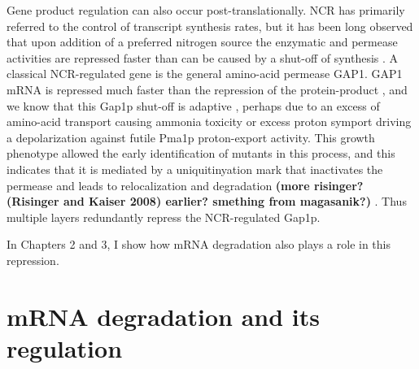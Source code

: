 Gene product
regulation can also occur post-translationally. NCR has primarily
referred to the control of transcript synthesis rates, but it has been
long observed that upon addition of a preferred nitrogen source the
enzymatic and permease activities are repressed faster than can be
caused by a shut-off of synthesis 
\citep{cooper1983function}. A
classical NCR-regulated gene is the general amino-acid permease GAP1.
GAP1 mRNA is repressed much faster than the repression of the
protein-product 
\citep{stanbrough1995transcriptional}
, and we know that this
Gap1p shut-off is adaptive \citep{risinger2006activity}, 
perhaps due to an
excess of amino-acid transport causing ammonia toxicity 
\citep{hess2006ammonium}
or excess proton symport driving a depolarization against futile
Pma1p proton-export activity. This growth phenotype allowed the early
identification of mutants in this process, and this indicates that it
is mediated by a uniquitinyation mark that inactivates the permease
and leads to relocalization and degradation 
\textbf{(more risinger? (Risinger and Kaiser 2008) earlier? smething
from magasanik?)}
. Thus multiple layers redundantly repress
the NCR-regulated Gap1p.  

In Chapters 2 and 3, I show how mRNA
degradation also plays a role in this repression.  

\section{mRNA degradation and its regulation}

